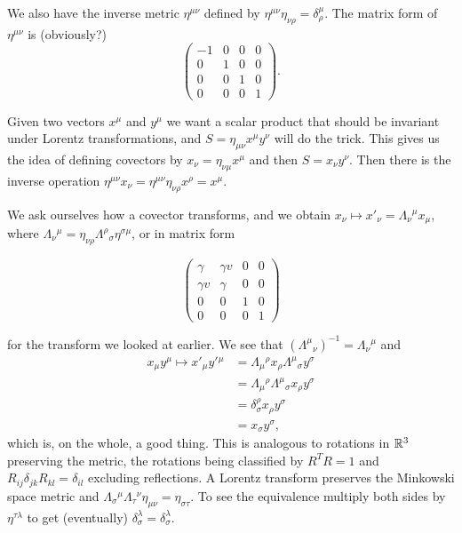 \documentclass{notes}
\begin{document}
We also have the inverse metric $\eta^{\mu \nu}$ defined by
$\eta^{\mu \nu} \eta_{\nu \rho} = \delta^\mu_\rho$.  The matrix form
of $\eta^{\mu \nu}$ is (obviously?)
\[
\begin{pmatrix}
-1 & 0 & 0 & 0 \\
0 & 1 & 0 & 0 \\
0 & 0 & 1 & 0 \\
0 & 0 & 0 & 1
\end{pmatrix}.
\]

Given two vectors $x^\mu$ and $y^\mu$ we want a scalar product that should
be invariant under Lorentz transformations, and $S = \eta_{\mu \nu}
x^\mu y^\nu$ will do the trick.  This gives us the idea of defining covectors
by $x_\nu = \eta_{\nu \mu} x^\mu$ and then $S = x_\nu y^\nu$.  Then
there is the inverse operation
$\eta^{\mu \nu} x_\nu = \eta^{\mu \nu} \eta_{\nu \rho} x^\rho = x^\mu$.

We ask ourselves how a covector transforms, and we obtain
$x_\nu \mapsto x'_\nu = \Lambda_\nu{}^\mu x_\mu$, where
$\Lambda_\nu{}^\mu = \eta_{\nu \rho} \Lambda^\rho{}_\sigma \eta^{\sigma \mu}$,
or in matrix form

\[
\begin{pmatrix}
\gamma & \gamma v & 0 & 0 \\
\gamma v & \gamma & 0 & 0 \\
0 & 0 & 1 & 0 \\
0 & 0 & 0 & 1
\end{pmatrix}
\]

for the transform we looked at earlier.  We see that
$(\Lambda^\mu{}_\nu)^{-1} = \Lambda_\nu{}^\mu$ and
\begin{align*}
x_\mu y^\mu \mapsto x'_\mu y'{}^\mu &= \Lambda_\mu{}^\rho
x_\rho \Lambda^\mu{}_\sigma y^\sigma \\
&= \Lambda_\mu{}^\rho \Lambda^\mu{}_\sigma x_\rho y^\sigma \\
&= \delta^\rho_\sigma x_\rho y^\sigma \\
&= x_\sigma y^\sigma,
\end{align*}
which is, on the whole, a good thing.  This is analogous to rotations in
$\mathbb{R}^3$ preserving the metric, the rotations being classified by
$R^T R = 1$ and $R_{ij} \delta_{jk} R_{kl} = \delta_{il}$ excluding
reflections.  A Lorentz transform preserves the Minkowski space metric and
$\Lambda_\sigma{}^\mu \Lambda_\tau{}^\nu \eta_{\mu \nu} = \eta_{\sigma \tau}$.
To see the equivalence multiply both sides by $\eta^{\tau \lambda}$ to
get (eventually) $\delta^\lambda_\sigma = \delta^\lambda_\sigma$.
\end{document}

